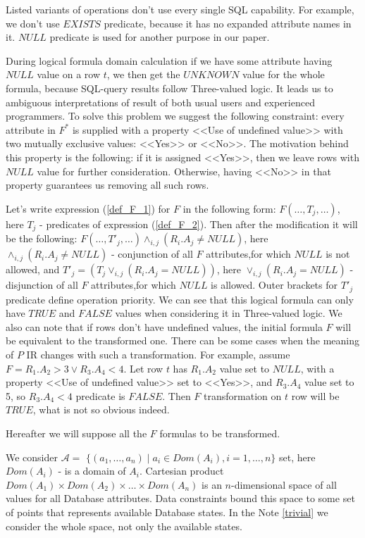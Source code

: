 \documentclass[10pt,a4paper]{article}
\def \n #1{\mathit{#1}}
\begin{document}
Listed variants of operations don't use every single SQL capability. For example, we don't use $\n{EXISTS}$ predicate, because it has no expanded attribute names in it. $\n{NULL}$ predicate is used for another purpose in our paper.

During logical formula domain calculation if we have some attribute having $NULL$ value on a row $t$, we then get the $\n{UNKNOWN}$ value for the whole formula, because SQL-query results follow Three-valued logic. It leads us to ambiguous interpretations of result of both usual users and experienced programmers. To solve this problem we suggest the following constraint: every attribute in $F^{\ast}$ is supplied with a property <<Use of undefined value>> with two mutually exclusive values: <<Yes>> or <<No>>. The motivation behind this property is the following: if it is assigned <<Yes>>, then we leave rows with $\n{NULL}$ value for further consideration. Otherwise, having <<No>> in that property guarantees us removing all such rows.

Let's write expression (\ref{def_F_1}) for $F$ in the following form: $ F ( \dots, T_j , \dots )$, here $T_j$ - predicates of expression (\ref{def_F_2}).
Then after the modification it will be the following: 
$F( \dots, T'_j , \dots )\wedge_{i,j}(R_i .A_j \neq  \n{NULL})$, here  $\wedge_{i,j}(R_i .A_j \neq  \n{NULL})$ - conjunction of all $F$ attributes,for which $\n{NULL}$ is not allowed, and $T'_j = (T_j \vee_{i,j}(R_i .A_j = \n{NULL}))$, here  $\vee_{i,j}(R_i .A_j = \n{NULL})$ - disjunction of all $F$ attributes,for which $\n{NULL}$ is allowed. Outer brackets for $T'_j$ predicate define operation priority. We can see that this logical formula can only have $\n{TRUE}$ and $\n{FALSE}$ values when considering it in Three-valued logic. We also can note that if rows don't have undefined values, the initial formula $F$ will be equivalent to the transformed one. There can be some cases when the meaning of $P$ IR changes with such a transformation. For example, assume $F = R_1 .A_2 > 3 \vee R_3 .A_4 < 4$. Let row $t$ has $R_1 .A_2$ value set to $\n{NULL}$, with a property <<Use of undefined value>> set to <<Yes>>, and $R_3 .A_4$ value set to 5, so $R_3 .A_4 < 4$ predicate is $\n{FALSE}$. Then $F$ transformation on $t$ row will be $\n{TRUE}$, what is not so obvious indeed.

Hereafter we will suppose all the $F$ formulas to be transformed.

We consider $\mathcal{A} =$ $\{(a_1, \dots, a_n)
\mid a_i \in Dom(A_i), i=1,\dots,n\}$ set, here $Dom(A_i)$ - is a domain of $A_i$.
Cartesian product $Dom(A_1)\times Dom(A_2)\times \dots \times Dom(A_n)$ is an $n$-dimensional space of all values for all Database attributes. Data constraints bound this space to some set of points that represents available Database states. In the Note \ref{trivial} we consider the whole space, not only the available states.
\end{document}
